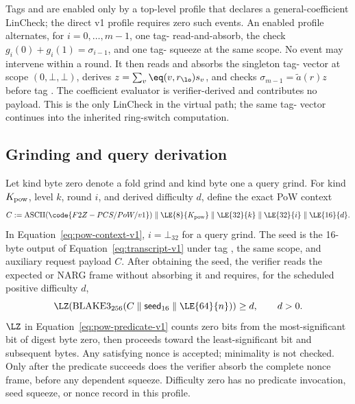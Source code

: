 Tags  and  are enabled only by a top-level profile that
declares a general-coefficient LinCheck; the direct v1 profile requires zero
such events.  An enabled profile alternates, for $i=0,\ldots,m-1$, one
tag- read-and-absorb, the check
$g_i(0)+g_i(1)=\sigma_{i-1}$, and one tag- squeeze at the same
scope.  No event may intervene within a round.  It then reads and absorbs the
singleton tag- vector at scope $(0,\bot,\bot)$, derives
$z=\sum_v\eq(v,r_{\lo})s_v$, and checks
$\sigma_{m-1}=\widetilde a(r)z$ before tag .  The coefficient
evaluator is verifier-derived and contributes no payload.  This is the only
LinCheck in the virtual path; the same tag- vector continues into
the inherited ring-switch computation.

\subsection{Grinding and query derivation}
\label{sec:wire-pow}

Let kind byte zero denote a fold grind and kind byte one a query grind.  For
kind $K_{\rm pow}$, level $k$, round $i$, and derived difficulty $d$, define
the exact PoW context
\begin{equation}
 C:=\operatorname{ASCII}(\code{F2Z-PCS/PoW/v1})\parallel
 \LE{8}{K_{\rm pow}}\parallel\LE{32}{k}\parallel
 \LE{32}{i}\parallel\LE{16}{d}.
 \label{eq:pow-context-v1}
\end{equation}
In Equation~\eqref{eq:pow-context-v1}, $i=\bot_{32}$ for a query grind.  The seed is the 16-byte output of
Equation~\eqref{eq:transcript-v1} under tag , the same scope, and
auxiliary request payload $C$.  After obtaining the seed, the verifier reads
the expected  or  NARG frame without absorbing it and
requires, for the scheduled positive difficulty $d$,
\begin{equation}
 \LZ\!\left(\operatorname{BLAKE3}_{256}
   (C\parallel\mathsf{seed}_{16}\parallel\LE{64}{n})\right)\ge d,
 \qquad d>0.
 \label{eq:pow-predicate-v1}
\end{equation}
$\LZ$ in Equation~\eqref{eq:pow-predicate-v1} counts zero bits from the
most-significant bit of digest byte zero, then proceeds toward the
least-significant bit and subsequent bytes.  Any satisfying nonce is accepted;
minimality is not checked.  Only after the predicate succeeds does
the verifier absorb the complete nonce frame, before any dependent squeeze.
Difficulty zero has no predicate invocation, seed squeeze, or nonce record in
this profile.

